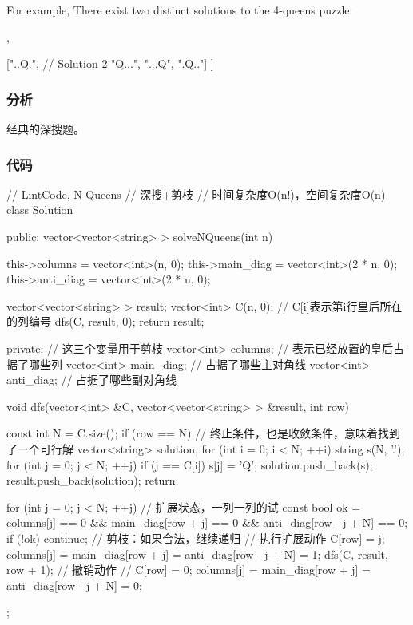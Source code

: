 For example,
There exist two distinct solutions to the 4-queens puzzle:
\begin{Code}
[
 [".Q..",  // Solution 1
  "...Q",
  "Q...",
  "..Q."],

 ["..Q.",  // Solution 2
  "Q...",
  "...Q",
  ".Q.."]
]
\end{Code}


\subsubsection{分析}
经典的深搜题。

\subsubsection{代码}
\begin{Code}
// LintCode, N-Queens
// 深搜+剪枝
// 时间复杂度O(n!)，空间复杂度O(n)
class Solution {
public:
    vector<vector<string> > solveNQueens(int n) {
        this->columns = vector<int>(n, 0);
        this->main_diag = vector<int>(2 * n, 0);
        this->anti_diag = vector<int>(2 * n, 0);

        vector<vector<string> > result;
        vector<int> C(n, 0);  // C[i]表示第i行皇后所在的列编号
        dfs(C, result, 0);
        return result;
    }
private:
    // 这三个变量用于剪枝
    vector<int> columns;  // 表示已经放置的皇后占据了哪些列
    vector<int> main_diag;  // 占据了哪些主对角线
    vector<int> anti_diag;  // 占据了哪些副对角线

    void dfs(vector<int> &C, vector<vector<string> > &result, int row) {
        const int N = C.size();
        if (row == N) { // 终止条件，也是收敛条件，意味着找到了一个可行解
            vector<string> solution;
            for (int i = 0; i < N; ++i) {
                string s(N, '.');
                for (int j = 0; j < N; ++j) {
                    if (j == C[i]) s[j] = 'Q';
                }
                solution.push_back(s);
            }
            result.push_back(solution);
            return;
        }

        for (int j = 0; j < N; ++j) {  // 扩展状态，一列一列的试
            const bool ok = columns[j] == 0 && main_diag[row + j] == 0 &&
                    anti_diag[row - j + N] == 0;
            if (!ok) continue;  // 剪枝：如果合法，继续递归
            // 执行扩展动作
            C[row] = j;
            columns[j] = main_diag[row + j] = anti_diag[row - j + N] = 1;
            dfs(C, result, row + 1);
            // 撤销动作
            // C[row] = 0;
            columns[j] = main_diag[row + j] = anti_diag[row - j + N] = 0;
        }
    }
};
\end{Code}


